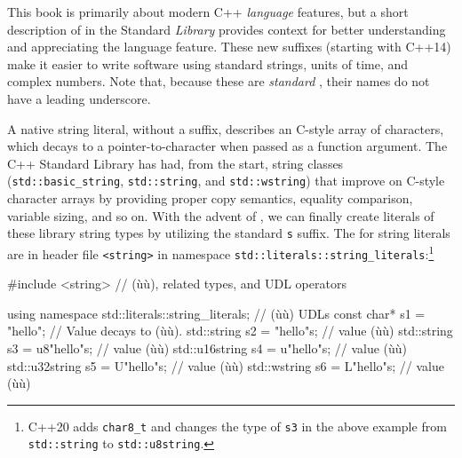 This book is primarily about modern C++ \emph{language} features, but a
short description of  in the Standard
\emph{Library} provides context for better understanding and
appreciating the  language feature. These new suffixes
(starting with C++14) make it easier to write software using standard
strings, units of time, and complex numbers. Note that, because these
are \emph{standard} , their names do not have a
leading underscore.

A native string literal, without a suffix, describes an C-style array of
characters, which decays to a pointer-to-character when passed as a
function argument. The C++ Standard Library has had, from the start,
string classes (\lstinline!std::basic_string!, \lstinline!std::string!, and
\lstinline!std::wstring!) that improve on C-style character arrays by
providing proper copy semantics, equality comparison, variable sizing,
and so on. With the advent of , we can finally create
literals of these library string types by utilizing the standard
\lstinline!s! suffix. The  for string literals are in
header file \lstinline!<string>! in namespace\linebreak%
\lstinline!std::literals::string_literals!:{\cprotect\footnote{C++20 adds \lstinline!char8_t!
and changes the type of \lstinline!s3! in the above example from \lstinline!std::string! to
\lstinline!std::u8string!.}}

\begin{emcppslisting}[emcppsstandards=c++14]
#include <string>  // (ù{}ù), related types, and UDL operators

using namespace std::literals::string_literals;  // (ù{}ù) UDLs
const char*    s1 =   "hello";    // Value decays to (ù{}ù).
std::string    s2 =   "hello"s;   // value (ù{}ù)
std::string    s3 = u8"hello"s;   // value (ù{}ù)
std::u16string s4 =  u"hello"s;   // value (ù{}ù)
std::u32string s5 =  U"hello"s;   // value (ù{}ù)
std::wstring   s6 =  L"hello"s;   // value (ù{}ù)
\end{emcppslisting}
    
